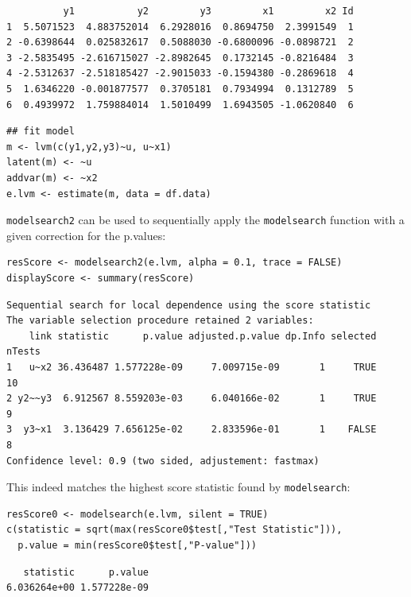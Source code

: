 \documentclass[12pt]{article}
\begin{document}
\begin{verbatim}
          y1           y2         y3         x1         x2 Id
1  5.5071523  4.883752014  6.2928016  0.8694750  2.3991549  1
2 -0.6398644  0.025832617  0.5088030 -0.6800096 -0.0898721  2
3 -2.5835495 -2.616715027 -2.8982645  0.1732145 -0.8216484  3
4 -2.5312637 -2.518185427 -2.9015033 -0.1594380 -0.2869618  4
5  1.6346220 -0.001877577  0.3705181  0.7934994  0.1312789  5
6  0.4939972  1.759884014  1.5010499  1.6943505 -1.0620840  6
\end{verbatim}


\lstset{language=r,label= ,caption= ,captionpos=b,numbers=none}
\begin{lstlisting}
## fit model
m <- lvm(c(y1,y2,y3)~u, u~x1)
latent(m) <- ~u
addvar(m) <- ~x2 
e.lvm <- estimate(m, data = df.data)
\end{lstlisting}

\texttt{modelsearch2} can be used to sequentially apply the \texttt{modelsearch}
function with a given correction for the p.values:
\lstset{language=r,label= ,caption= ,captionpos=b,numbers=none}
\begin{lstlisting}
resScore <- modelsearch2(e.lvm, alpha = 0.1, trace = FALSE)
displayScore <- summary(resScore)
\end{lstlisting}

\begin{verbatim}
Sequential search for local dependence using the score statistic 
The variable selection procedure retained 2 variables:
    link statistic      p.value adjusted.p.value dp.Info selected nTests
1   u~x2 36.436487 1.577228e-09     7.009715e-09       1     TRUE     10
2 y2~~y3  6.912567 8.559203e-03     6.040166e-02       1     TRUE      9
3  y3~x1  3.136429 7.656125e-02     2.833596e-01       1    FALSE      8
Confidence level: 0.9 (two sided, adjustement: fastmax)
\end{verbatim}


This indeed matches the highest score statistic found by
\texttt{modelsearch}:
\lstset{language=r,label= ,caption= ,captionpos=b,numbers=none}
\begin{lstlisting}
resScore0 <- modelsearch(e.lvm, silent = TRUE)
c(statistic = sqrt(max(resScore0$test[,"Test Statistic"])), 
  p.value = min(resScore0$test[,"P-value"]))
\end{lstlisting}

\begin{verbatim}
   statistic      p.value 
6.036264e+00 1.577228e-09
\end{verbatim}
\end{document}
